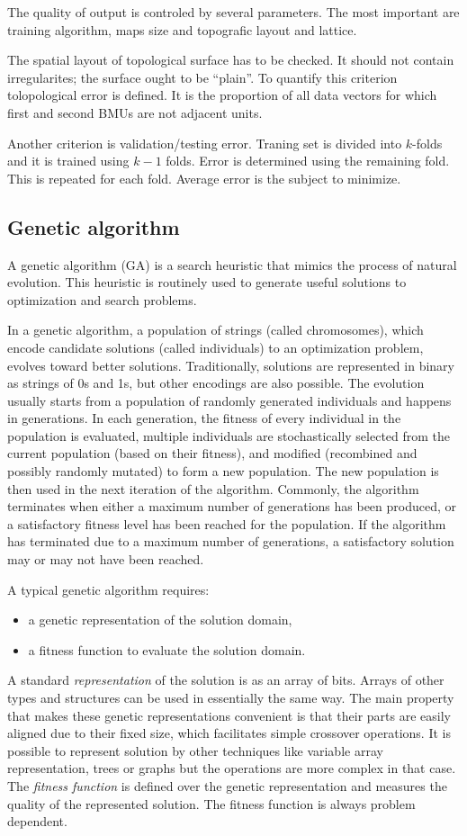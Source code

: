 \documentclass[a4paper,jurnal]{IEEEtran}
\begin{document}
The quality of output is controled by several parameters. The most important are 
training algorithm, maps size and topografic layout and lattice.

The spatial 
layout of topological surface has to be checked. 
It should not contain irregularites; the surface ought to be ``plain''.
To quantify this criterion tolopological error is defined. It is the proportion 
of all data vectors for which first and second BMUs are not adjacent units.

Another criterion is validation/testing error. Traning set is divided into $ k $-folds
and it is trained using $ k-1 $ folds. Error is determined using the remaining fold. 
This is repeated for each fold.
Average error is the subject to minimize.

\subsection{Genetic algorithm}
A genetic algorithm (GA) is a search heuristic that mimics the 
process of natural evolution. This heuristic is routinely used to 
generate useful solutions to optimization and search problems.

In a genetic algorithm, a population of strings (called chromosomes), 
which encode candidate solutions (called individuals) to an optimization problem,
evolves toward better solutions.
Traditionally, solutions are represented in binary as strings of 0s and 1s, 
but other encodings are also possible. 
The evolution usually starts from a population of randomly generated individuals 
and happens in generations.
In each generation, the fitness of every individual in the population is evaluated,
multiple individuals are stochastically selected from the current population 
(based on their fitness), and modified (recombined and possibly randomly mutated) 
to form a new population. The new population is then used in the next 
iteration of the algorithm. 
Commonly, the algorithm terminates when either a maximum number of generations 
has been produced, or a satisfactory fitness level has been reached 
for the population. 
If the algorithm has terminated due to a maximum number of generations, 
a satisfactory solution may or may not have been reached.

A typical genetic algorithm requires:
\begin{itemize}
	\item a genetic representation of the solution domain,
	\item a fitness function to evaluate the solution domain.
\end{itemize}
A standard \textit{representation} of the solution is as an array of bits. 
Arrays of other types and structures can be used in essentially the same way. 
The main property that makes these genetic representations convenient 
is that their parts are easily aligned due to their fixed size,
which facilitates simple crossover operations. It is possible to 
represent solution by other techniques like variable array representation,
trees or graphs but the operations are more complex in that case.
The \textit{fitness function} is defined over the genetic representation and
measures the quality of the represented solution. The fitness function 
is always problem dependent.
\end{document}
